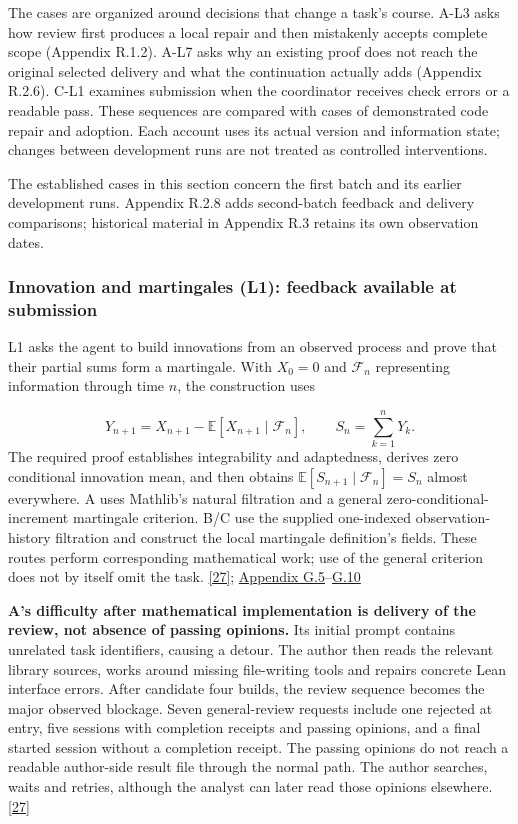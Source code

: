 The cases are organized around decisions that change a task's course. A-L3 asks how review first produces a local repair and then mistakenly accepts complete scope (Appendix R.1.2). A-L7 asks why an existing proof does not reach the original selected delivery and what the continuation actually adds (Appendix R.2.6). C-L1 examines submission when the coordinator receives check errors or a readable pass. These sequences are compared with cases of demonstrated code repair and adoption. Each account uses its actual version and information state; changes between development runs are not treated as controlled interventions.

The established cases in this section concern the first batch and its earlier development runs. Appendix R.2.8 adds second-batch feedback and delivery comparisons; historical material in Appendix R.3 retains its own observation dates.

\subsubsection[Innovation and martingales (L1): feedback available at submission]{\texorpdfstring{\protect\hypertarget{r2-1}{}Innovation and martingales (L1): feedback available at submission}{Innovation and martingales (L1): feedback available at submission}}
L1 asks the agent to build innovations from an observed process and prove that their partial sums form a martingale. With $X_0=0$ and $\mathcal F_n$ representing information through time $n$, the construction uses

\[
Y_{n+1}=X_{n+1}-\mathbb E[X_{n+1}\mid\mathcal F_n],\qquad
S_n=\sum_{k=1}^{n}Y_k.
\]
The required proof establishes integrability and adaptedness, derives zero conditional innovation mean, and then obtains $\mathbb E[S_{n+1}\mid\mathcal F_n]=S_n$ almost everywhere. A uses Mathlib's natural filtration and a general zero-conditional-increment martingale criterion. B/C use the supplied one-indexed observation-history filtration and construct the local martingale definition's fields. These routes perform corresponding mathematical work; use of the general criterion does not by itself omit the task. \href{en.pdf\#ref-27}{\mbox{[27]}}; \href{en-appendix.pdf\#g5}{Appendix G.5}–\href{en-appendix.pdf\#g10}{G.10}

\textbf{A's difficulty after mathematical implementation is delivery of the review, not absence of passing opinions.} Its initial prompt contains unrelated task identifiers, causing a detour. The author then reads the relevant library sources, works around missing file-writing tools and repairs concrete Lean interface errors. After candidate four builds, the review sequence becomes the major observed blockage. Seven general-review requests include one rejected at entry, five sessions with completion receipts and passing opinions, and a final started session without a completion receipt. The passing opinions do not reach a readable author-side result file through the normal path. The author searches, waits and retries, although the analyst can later read those opinions elsewhere. \href{en.pdf\#ref-27}{\mbox{[27]}}

